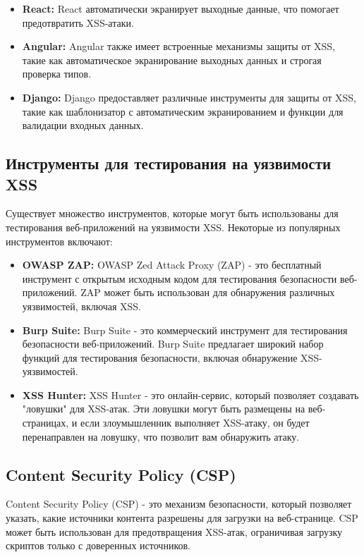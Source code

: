 \documentclass[a4paper,12pt]{diplom}
\begin{document}
	 \begin{itemize}
	 	\item \textbf{React:} React автоматически экранирует выходные данные, что помогает предотвратить XSS-атаки.
	 	\item \textbf{Angular:} Angular также имеет встроенные механизмы защиты от XSS, такие как автоматическое экранирование выходных данных и строгая проверка типов.
	 	\item \textbf{Django:} Django предоставляет различные инструменты для защиты от XSS, такие как шаблонизатор с автоматическим экранированием и функции для валидации входных данных.
	 \end{itemize}
	 
	 \subsection{Инструменты для тестирования на уязвимости XSS}
	 
	 Существует множество инструментов, которые могут быть использованы для тестирования веб-приложений на уязвимости XSS. Некоторые из популярных инструментов включают:
	 
	 \begin{itemize}
	 	\item \textbf{OWASP ZAP:} OWASP Zed Attack Proxy (ZAP) - это бесплатный инструмент с открытым исходным кодом для тестирования безопасности веб-приложений. ZAP может быть использован для обнаружения различных уязвимостей, включая XSS.\cite{ZAP_habr}\cite{ZAP_tool}
	 	\item \textbf{Burp Suite:} Burp Suite - это коммерческий инструмент для тестирования безопасности веб-приложений. Burp Suite предлагает широкий набор функций для тестирования безопасности, включая обнаружение XSS-уязвимостей.\cite{Burp_Suite_habr}\cite{Burp_Suite_tool}
	 	\item \textbf{XSS Hunter:} XSS Hunter - это онлайн-сервис, который позволяет создавать "ловушки" для XSS-атак. Эти ловушки могут быть размещены на веб-страницах, и если злоумышленник выполняет XSS-атаку, он будет перенаправлен на ловушку, что позволит вам обнаружить атаку.\cite{XSS_Hunter_tool}
	 \end{itemize}
	 
	 \subsection{Content Security Policy (CSP)}
	 
	 Content Security Policy (CSP) - это механизм безопасности, который позволяет указать, какие источники контента разрешены для загрузки на веб-странице. CSP может быть использован для предотвращения XSS-атак, ограничивая загрузку скриптов только с доверенных источников.
	 
\end{document}
